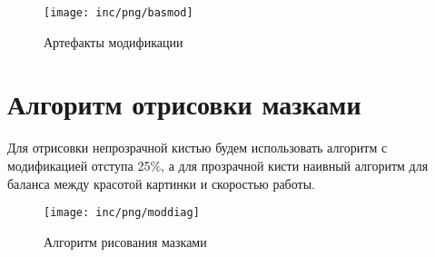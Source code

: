 \begin{figure}
	[ht]
	\centering
	\texttt{[image: inc/png/basmod]}
	\caption{Артефакты модификации}
	\label{fig:fig11}
\end{figure} 
\section{Алгоритм отрисовки мазками}
Для отрисовки непрозрачной кистью будем использовать алгоритм с модификацией отступа 25\%, а для прозрачной кисти наивный алгоритм для баланса между красотой картинки и скоростью работы.

\begin{figure}
	
	\centering
	\texttt{[image: inc/png/moddiag]}
	\caption{Алгоритм рисования мазками}
	\label{fig:fig12}
\end{figure} 



